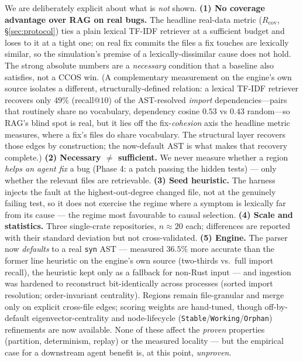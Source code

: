 \documentclass[11pt]{article}
\begin{document}
We are deliberately explicit about what is \emph{not} shown.
\textbf{(1) No coverage advantage over RAG on real bugs.} The headline real-data
metric ($R_{\mathrm{cov}}$, \S\ref{sec:protocol}) ties a plain lexical TF-IDF
retriever at a sufficient budget and loses to it at a tight one; on real fix
commits the files a fix touches are lexically similar, so the simulation's premise
of a lexically-dissimilar cause does not hold. The strong absolute numbers are a
\emph{necessary} condition that a baseline also satisfies, not a CCOS win.
(A complementary measurement on the engine's own source isolates a different,
structurally-defined relation: a lexical TF-IDF retriever recovers only $49\%$
(recall@$10$) of the AST-resolved \emph{import} dependencies---pairs that routinely
share no vocabulary, dependency cosine $0.53$ vs $0.43$ random---so RAG's blind spot
is real, but it lies off the fix-\emph{cohesion} axis the headline metric measures,
where a fix's files do share vocabulary. The structural layer recovers those edges by
construction; the now-default AST is what makes that recovery complete.)
\textbf{(2) Necessary $\neq$ sufficient.} We never measure whether a region
\emph{helps an agent fix} a bug (Phase 4: a patch passing the hidden tests) ---
only whether the relevant files are retrievable.
\textbf{(3) Seed heuristic.} The harness injects the fault at the
highest-out-degree changed file, not at the genuinely failing test, so it does not
exercise the regime where a symptom is lexically far from its cause --- the regime
most favourable to causal selection.
\textbf{(4) Scale and statistics.} Three single-crate repositories, $n\!\approx\!20$
each; differences are reported with their standard deviation but not cross-validated.
\textbf{(5) Engine.} The parser now \emph{defaults} to a real \texttt{syn} AST ---
measured $36.5\%$ more accurate than the former line heuristic on the engine's own
source (two-thirds vs.\ full import recall), the heuristic kept only as a fallback for
non-Rust input --- and ingestion was hardened to reconstruct bit-identically across
processes (sorted import resolution; order-invariant centrality). Regions remain
file-granular and merge only on explicit cross-file edges; scoring weights are
hand-tuned, though off-by-default eigenvector-centrality and node-lifecycle
(\texttt{Stable}/\texttt{Working}/\texttt{Orphan}) refinements are now available. None of
these affect the \emph{proven} properties (partition, determinism, replay) or the
measured locality --- but the empirical case for a downstream agent benefit is, at this
point, \emph{unproven}.
\end{document}
